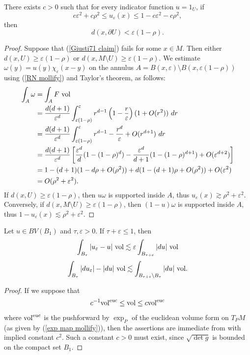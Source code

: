\begin{lemma}\label{Giusti71}
There exists $c > 0$ such that for every indicator function $u = 1_U$, if
$$c\varepsilon^2 + c\rho^2 \leq u_\varepsilon(x) \leq 1 - c\varepsilon^2 - c\rho^2,$$
then
\begin{equation}\label{Giusti71 claim}
d(x, \partial U) < \varepsilon(1 - \rho).
\end{equation}
\end{lemma}
\begin{proof}
Suppose that (\ref{Giusti71 claim}) fails for some $x \in M$. Then either $d(x, U) \geq \varepsilon(1 - \rho)$ or $d(x, M \setminus U) \geq \varepsilon(1 - \rho)$.
We estimate $\omega(y) = u(y)\chi_\varepsilon(x - y)$ on the annulus $A = B(x, \varepsilon) \setminus B(x, \varepsilon(1 - \rho))$ using (\ref{RN mollify}) and Taylor's theorem, as follows:
\begin{align*}
\int_A \omega &= \int_A F ~\mathrm{vol} \\
&= \frac{d(d + 1)}{\varepsilon^d} \int_{\varepsilon(1 - \rho)}^\varepsilon r^{d - 1}\left(1 - \frac{r}{\varepsilon}\right)(1 + O(r^2)) ~dr \\
&= \frac{d(d + 1)}{\varepsilon^d} \int_{\varepsilon(1 - \rho)}^\varepsilon r^{d - 1} - \frac{r^d}{\varepsilon} + O(r^{d + 1}) ~dr\\
&= \frac{d(d + 1)}{\varepsilon^d} \left[\frac{\varepsilon^d}{d}(1 - (1 - \rho)^d) - \frac{\varepsilon^d}{d + 1}(1 - (1 - \rho)^{d + 1}) + O(\varepsilon^{d + 2})\right]\\
&= 1 - (d + 1)(1 - d\rho + O(\rho^2)) + d(1 - (d + 1)\rho + O(\rho^2)) + O(\varepsilon^2) \\
&= O(\rho^2 + \varepsilon^2).
\end{align*}
If $d(x, U) \geq \varepsilon(1 - \rho)$, then $u\omega$ is supported inside $A$, thus $u_\varepsilon(x) \gtrsim \rho^2 + \varepsilon^2$.
Conversely, if $d(x, M \setminus U) \geq \varepsilon(1 - \rho)$, then $(1 - u)\omega$ is supported inside $A$, thus $1 - u_\varepsilon(x) \lesssim \rho^2 + \varepsilon^2$.
\end{proof}

\begin{lemma}\label{Giusti72}
Let $u \in BV(B_1)$ and $\tau, \varepsilon > 0$. If $\tau + \varepsilon \leq 1$, then
$$\int_{B_\tau} |u_\varepsilon - u| ~\mathrm{vol} \lesssim \varepsilon \int_{B_{\tau + \varepsilon}} |du| ~\mathrm{vol}$$
$$\int_{B_\tau} |du_\varepsilon| - |du| ~\mathrm{vol} \lesssim \int_{B_{\tau + \varepsilon} \setminus B_\tau} |du| ~\mathrm{vol}.$$
\end{lemma}
\begin{proof}
If we suppose that
$$c^{-1} \mathrm{vol}^{\mathrm{euc}} \leq \mathrm{vol} \leq c\mathrm{vol}^{\mathrm{euc}}$$
where $\mathrm{vol}^{\mathrm{euc}}$ is the pushforward by $\exp_P$ of the euclidean volume form on $T_PM$ (as given by (\ref{exp map mollify})), then the assertions are immediate from \cite[Lemma 7.2]{Giusti77} with implied constant $c^2$.
Such a constant $c > 0$ must exist, since $\sqrt{\det g}$ is bounded on the compact set $B_1$.
\end{proof}

